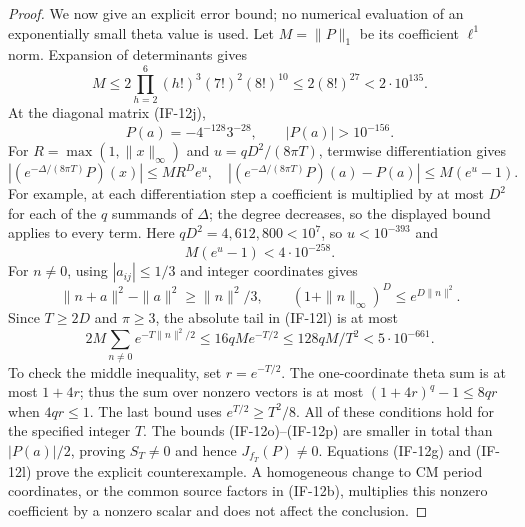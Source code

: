 \begin{proof}
We now give an explicit error bound; no numerical evaluation of an
exponentially small theta value is used. Let $M=\|P\|_1$ be its
coefficient $\ell^1$ norm. Expansion of determinants gives
\[
 M\le 2\prod_{h=2}^{6}(h!)^3(7!)^2(8!)^{10}
                  \le2(8!)^{27}<2\cdot10^{135}.                \tag{IF-12m}
\]
At the diagonal matrix (IF-12j),
\[
           P(a)=-4^{-128}3^{-28},\qquad |P(a)|>10^{-156}.
                                                               \tag{IF-12n}
\]
For $R=\max(1,\|x\|_\infty)$ and
$u=qD^2/(8\pi T)$, termwise differentiation gives
\[
 |(e^{-\Delta/(8\pi T)}P)(x)|\le M R^D e^u,
 \quad |(e^{-\Delta/(8\pi T)}P)(a)-P(a)|\le M(e^u-1).
\]
For example, at each differentiation step a coefficient is
multiplied by at most $D^2$ for each of the $q$ summands of $\Delta$;
the degree decreases, so the displayed bound applies to every term.
Here $qD^2=4{,}612{,}800<10^7$, so $u<10^{-393}$ and
\[
                  M(e^u-1)<4\cdot10^{-258}.                   \tag{IF-12o}
\]
For $n\ne0$, using $|a_{ij}|\le1/3$ and integer coordinates gives
\[
 \|n+a\|^2-\|a\|^2\ge\|n\|^2/3,
 \qquad
 (1+\|n\|_\infty)^D\le e^{D\|n\|^2}.
\]
Since $T\ge2D$ and $\pi\ge3$, the absolute tail in (IF-12l) is at
most
\[
 2M\sum_{n\ne0}e^{-T\|n\|^2/2}
 \le16qM e^{-T/2}
 \le128qM/T^2
 <5\cdot10^{-661}.                                            \tag{IF-12p}
\]
To check the middle inequality, set $r=e^{-T/2}$. The
one-coordinate theta sum is at most $1+4r$; thus the sum over
nonzero vectors is at most $(1+4r)^q-1\le8qr$ when $4qr\le1$.
The last bound uses $e^{T/2}\ge T^2/8$. All of these conditions
hold for the specified integer $T$. The bounds (IF-12o)--(IF-12p)
are smaller in total than $|P(a)|/2$, proving $S_T\ne0$ and hence
$J_{f_T}(P)\ne0$. Equations (IF-12g) and (IF-12l) prove the explicit
counterexample. A homogeneous change to CM period coordinates, or
the common source factors in (IF-12b), multiplies this nonzero
coefficient by a nonzero scalar and does not affect the conclusion.


\end{proof}
